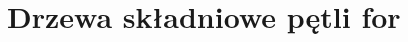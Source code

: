 \documentclass[10pt,t]{beamer}
\begin{document}
\begin{frame}

\end{frame}










\section{Drzewa składniowe pętli for}

\label{sec:Podstawy-budowy-procesora-i-jezyka-asemblera}
\end{document}
